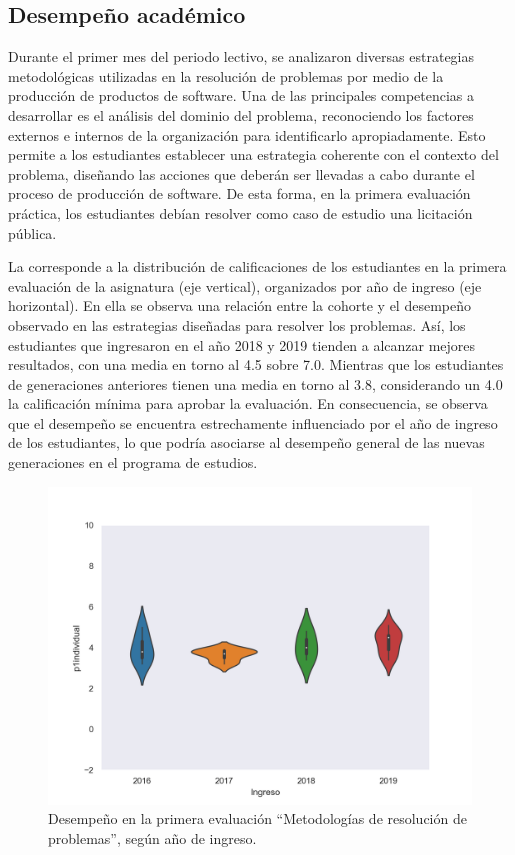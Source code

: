 \documentclass[spanish]{textolivre}
\begin{document}
\subsection{Desempeño académico}

Durante el primer mes del periodo lectivo, se analizaron diversas estrategias metodológicas utilizadas en la resolución de problemas por medio de la producción de productos de software. Una de las principales competencias a desarrollar es el análisis del dominio del problema, reconociendo los factores externos e internos de la organización para identificarlo apropiadamente. Esto permite a los estudiantes establecer una estrategia coherente con el contexto del problema, diseñando las acciones que deberán ser llevadas a cabo durante el proceso de producción de software. De esta forma, en la primera evaluación práctica, los estudiantes debían resolver como caso de estudio una licitación pública. 

La  corresponde a la distribución de calificaciones de los estudiantes en la primera evaluación de la asignatura (eje vertical), organizados por año de ingreso (eje horizontal). En ella se observa una relación entre la cohorte y el desempeño observado en las estrategias diseñadas para resolver los problemas. Así, los estudiantes que ingresaron en el año 2018 y 2019 tienden a alcanzar mejores resultados, con una media en torno al 4.5 sobre 7.0. Mientras que los estudiantes de generaciones anteriores tienen una media en torno al 3.8, considerando un 4.0 la calificación mínima para aprobar la evaluación. En consecuencia, se observa que el desempeño se encuentra estrechamente influenciado por el año de ingreso de los estudiantes, lo que podría asociarse al desempeño general de las nuevas generaciones en el programa de estudios.

\begin{figure}[H]
\centering
\begin{minipage}{.75\textwidth}
 \includegraphics[width=\textwidth]{figuras/figura2.png}
 \caption{Desempeño en la primera evaluación “Metodologías de resolución de problemas”, según año de ingreso.}
 \label{fig-eval1}
\end{minipage}
\end{figure}
\end{document}
